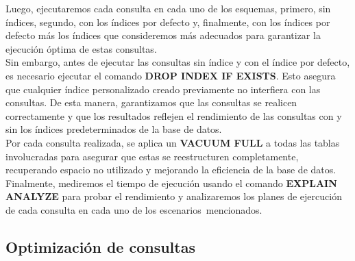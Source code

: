 Luego, ejecutaremos cada consulta en cada uno de los esquemas, primero, sin índices, segundo, con los índices por defecto y, finalmente, con los índices por defecto más los índices que consideremos más adecuados para garantizar la ejecución óptima de estas consultas.\\

Sin embargo, antes de ejecutar las consultas sin índice y con el índice por defecto, es necesario ejecutar el comando \textbf{DROP INDEX IF EXISTS}. Esto asegura que cualquier índice personalizado creado previamente no interfiera con las consultas. De esta manera, garantizamos que las consultas se realicen correctamente y que los resultados reflejen el rendimiento de las consultas con y sin los índices predeterminados de la base de datos. \\

Por cada consulta realizada, se aplica un \textbf{VACUUM FULL} a todas las tablas involucradas para asegurar que estas se reestructuren completamente, recuperando espacio no utilizado y mejorando la eficiencia de la base de datos. \\

Finalmente, mediremos el tiempo de ejecución usando el comando \textbf{EXPLAIN ANALYZE} para probar el rendimiento y analizaremos los planes de ejercución de cada consulta en cada uno de los escenarios mencionados.
\subsection{Optimización de consultas}
